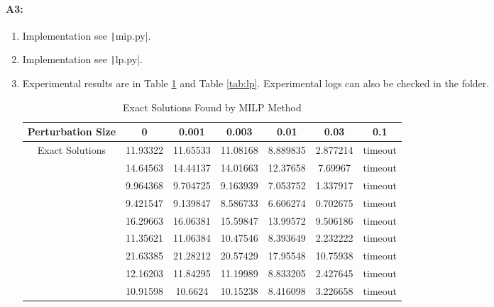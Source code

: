 \documentclass[12pt]{article}
\begin{document}
\paragraph{A3:}
\begin{enumerate}[1.]
\item Implementation see \texttt|mip.py|.

\item Implementation see \texttt|lp.py|.

\item Experimental results are in Table \ref{tab:milp} and Table \ref{tab:lp}. Experimental logs can also be checked in the folder. 
\begin{table}[H]
	\centering
	\caption{Exact Solutions Found by MILP Method}
	\begin{tabular}{ccccccc}
		\toprule
		Perturbation Size & 0    & 0.001 & 0.003 & 0.01 & 0.03 & 0.1 \\
		\midrule
		\multirow{9}[2]{*}{Exact Solutions} & 11.93322 & 11.65533 & 11.08168 & 8.889835 & 2.877214 & timeout \\
		& 14.64563 & 14.44137 & 14.01663 & 12.37658 & 7.69967 & timeout \\
		& 9.964368 & 9.704725 & 9.163939 & 7.053752 & 1.337917 & timeout \\
		& 9.421547 & 9.139847 & 8.586733 & 6.606274 & 0.702675 & timeout \\
		& 16.29663 & 16.06381 & 15.59847 & 13.99572 & 9.506186 & timeout \\
		& 11.35621 & 11.06384 & 10.47546 & 8.393649 & 2.232222 & timeout \\
		& 21.63385 & 21.28212 & 20.57429 & 17.95548 & 10.75938 & timeout \\
		& 12.16203 & 11.84295 & 11.19989 & 8.833205 & 2.427645 & timeout \\
		& 10.91598 & 10.6624 & 10.15238 & 8.416098 & 3.226658 & timeout \\
		\bottomrule
	\end{tabular}
	\label{tab:milp}
\end{table}


\end{enumerate}
\end{document}
